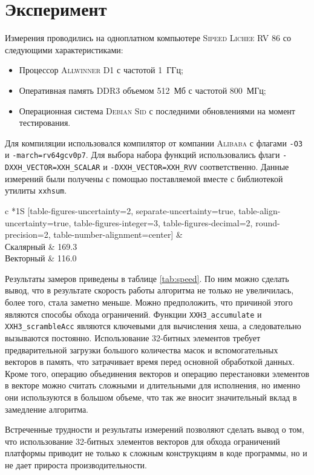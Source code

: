 
\section{Эксперимент}

Измерения проводились на одноплатном компьютере \textsc{Sipeed Lichee RV 86} со следующими характеристиками:
\begin{itemize}
	\item Процессор \textsc{Allwinner D1} с частотой 1~ГГц;
	\item Оперативная память \textsc{DDR3} объемом 512~Мб с частотой 800~МГц;
	\item Операционная система \textsc{Debian Sid} с последними обновлениями на момент тестирования.
\end{itemize}

Для компиляции использовался компилятор от компании \textsc{Alibaba} с флагами \texttt{-O3} и \texttt{-march=rv64gcv0p7}.
Для выбора набора функций использовались флаги \texttt{-DXXH\_VECTOR=XXH\_SCALAR} и \texttt{-DXXH\_VECTOR=XXH\_RVV} соответственно.
Данные измерений были получены с помощью поставляемой вместе с библиотекой утилиты \texttt{xxhsum}.

\begin{table}[h]
	\def\arraystretch{1.1}  %
	\setlength\tabcolsep{0.2em}
	\centering
	\caption{Сравнение производительности хеш-функции  на входных данных размером в 1000~Кб; числа приведены с относительной погрешностью 0.1\%}
	\begin{tabular}[C]{
			c
			*1{S
						[table-figures-uncertainty=2, separate-uncertainty=true, table-align-uncertainty=true,
							table-figures-integer=3, table-figures-decimal=2, round-precision=2,
							table-number-alignment=center]
				}
		}
		\toprule
		 &  \\ \midrule
		Скалярный & 169.3 \\ \midrule
		Векторный & 116.0 \\
		\bottomrule
	\end{tabular}
	\label{tab:speed}
\end{table}

Результаты замеров приведены в таблице \ref{tab:speed}.
По ним можно сделать вывод, что в результате скорость работы алгоритма не только не увеличилась, более того, стала заметно меньше.
Можно предположить, что причиной этого являются способы обхода ограничений.
Функции \texttt{XXH3\_accumulate} и \texttt{XXH3\_scrambleAcc} являются ключевыми для вычисления хеша, а следовательно вызываются постоянно.
Использование 32-битных элементов требует предварительной загрузки большого количества масок и вспомогательных векторов в память, что затрачивает время перед основной обработкой данных.
Кроме того, операцию объединения векторов и операцию перестановки элементов в векторе можно считать сложными и длительными для исполнения, но именно они используются в большом объеме, что так же вносит значительный вклад в замедление алгоритма.

Встреченные трудности и результаты измерений позволяют сделать вывод о том, что использование 32-битных элементов векторов для обхода ограничений платформы приводит не только к сложным конструкциям в коде программы, но и не дает прироста производительности.
